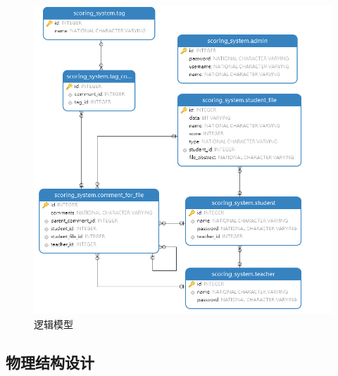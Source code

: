 \begin{figure}[ht]
    \centering
    \includegraphics[scale = 0.6]{out/uml/数据库/logical-model.png}
    \caption{\song\wuhao 逻辑模型}
    \label{logical-model}
\end{figure}

\subsection{物理结构设计}

